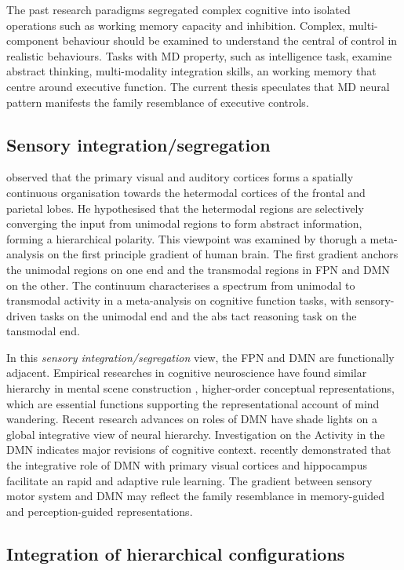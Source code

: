 The past research paradigms segregated complex cognitive into isolated operations such as working memory capacity and inhibition. Complex, multi-component behaviour should be examined to understand the central of control in realistic behaviours. Tasks with MD property, such as intelligence task, examine abstract thinking, multi-modality integration skills, an working memory that centre around executive function. The current thesis speculates that MD neural pattern manifests the family resemblance of executive controls. 

\subsection{Sensory integration/segregation}
 observed that the primary visual and auditory cortices forms a spatially continuous organisation towards the hetermodal cortices of the frontal and parietal lobes. He hypothesised that the hetermodal regions are selectively converging the input from unimodal regions to form abstract information, forming a hierarchical polarity. This viewpoint was examined by  thorugh a meta-analysis on the first principle gradient of human brain. The first gradient anchors the unimodal regions on one end and the transmodal regions in FPN and DMN on the other. The continuum characterises a spectrum from unimodal to transmodal activity in a meta-analysis on cognitive function tasks, with sensory-driven tasks on the unimodal end and the abs tact reasoning task on the tansmodal end. 

In this \textit{sensory integration/segregation} view, the FPN and DMN are functionally adjacent. Empirical researches in cognitive neuroscience have found similar hierarchy in mental scene construction \cite{Villena-Gonzalez2018}, higher-order conceptual representations\cite{Murphy2018}, which are essential functions supporting the representational account of mind wandering. Recent research advances on roles of DMN have shade lights on a global integrative view of neural hierarchy. Investigation on the Activity in the DMN indicates major revisions of cognitive context.  recently demonstrated that the integrative role of DMN with primary visual cortices and hippocampus facilitate an rapid and adaptive rule learning. The gradient between sensory motor system and DMN may reflect the family resemblance in memory-guided and perception-guided representations.


\subsection{Integration of hierarchical configurations}


